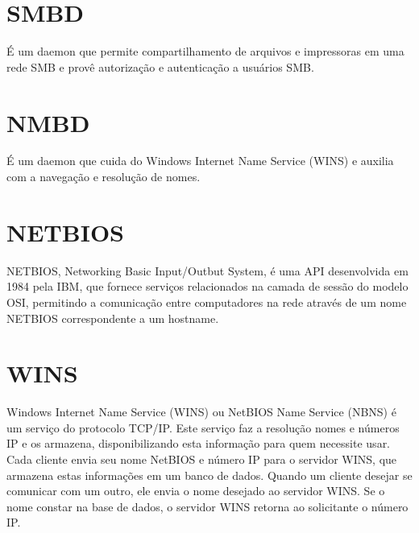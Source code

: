 
\section{SMBD}

É um daemon que permite compartilhamento de arquivos e impressoras em uma rede SMB e provê autorização e autenticação a usuários SMB. \cite{SAMBA}

\section{NMBD}

É um daemon que cuida do Windows Internet Name Service (WINS) e auxilia com a navegação e resolução de nomes.
\cite{SAMBA}

\section{NETBIOS}

NETBIOS, Networking Basic Input/Outbut System, é uma API desenvolvida em 1984 pela IBM, que fornece serviços relacionados na camada de sessão do modelo OSI, permitindo a comunicação entre computadores na rede através de um nome NETBIOS correspondente a um hostname.\cite{WIKIPEDIA}

% 
% 

\section{WINS}

Windows Internet Name Service (WINS) ou NetBIOS Name Service (NBNS) é um serviço do protocolo TCP/IP. Este serviço faz a resolução nomes e números IP e os armazena, disponibilizando esta informação para quem necessite usar. Cada cliente envia seu nome NetBIOS e número IP para o servidor WINS, que armazena estas informações em um banco de dados. Quando um cliente desejar se comunicar com um outro, ele envia o nome desejado ao servidor WINS. Se o nome constar na base de dados, o servidor WINS retorna ao solicitante o número IP.

